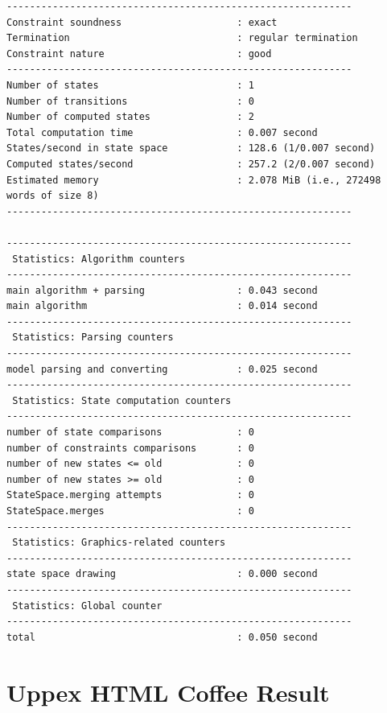 \begin{verbatim}
------------------------------------------------------------
Constraint soundness                    : exact
Termination                             : regular termination
Constraint nature                       : good
------------------------------------------------------------
Number of states                        : 1
Number of transitions                   : 0
Number of computed states               : 2
Total computation time                  : 0.007 second
States/second in state space            : 128.6 (1/0.007 second)
Computed states/second                  : 257.2 (2/0.007 second)
Estimated memory                        : 2.078 MiB (i.e., 272498 words of size 8)
------------------------------------------------------------

------------------------------------------------------------
 Statistics: Algorithm counters
------------------------------------------------------------
main algorithm + parsing                : 0.043 second
main algorithm                          : 0.014 second
------------------------------------------------------------
 Statistics: Parsing counters
------------------------------------------------------------
model parsing and converting            : 0.025 second
------------------------------------------------------------
 Statistics: State computation counters
------------------------------------------------------------
number of state comparisons             : 0
number of constraints comparisons       : 0
number of new states <= old             : 0
number of new states >= old             : 0
StateSpace.merging attempts             : 0
StateSpace.merges                       : 0
------------------------------------------------------------
 Statistics: Graphics-related counters
------------------------------------------------------------
state space drawing                     : 0.000 second
------------------------------------------------------------
 Statistics: Global counter
------------------------------------------------------------
total                                   : 0.050 second
\end{verbatim}

\chapter{Uppex HTML Coffee Result}

